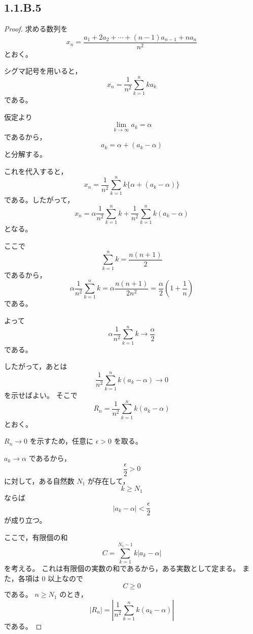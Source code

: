 \subsection{1.1.B.5}
\begin{proof}
    求める数列を
    \[
        x_n=
        \frac{a_1+2a_2+\cdots+(n-1)a_{n-1}+na_n}{n^2}
    \]
    とおく。

    シグマ記号を用いると，
    \[
        x_n=
        \frac{1}{n^2}\sum_{k=1}^{n}ka_k
    \]
    である。

    仮定より
    \[
        \lim_{k\to\infty}a_k=\alpha
    \]
    であるから，
    \[
        a_k=\alpha+(a_k-\alpha)
    \]
    と分解する。

    これを代入すると，
    \[
        x_n
        =
        \frac{1}{n^2}\sum_{k=1}^{n}k\{\alpha+(a_k-\alpha)\}
    \]
    である。したがって，
    \[
        x_n
        =
        \alpha\frac{1}{n^2}\sum_{k=1}^{n}k
        +
        \frac{1}{n^2}\sum_{k=1}^{n}k(a_k-\alpha)
    \]
    となる。

    ここで
    \[
        \sum_{k=1}^{n}k=\frac{n(n+1)}{2}
    \]
    であるから，
    \[
        \alpha\frac{1}{n^2}\sum_{k=1}^{n}k
        =
        \alpha\frac{n(n+1)}{2n^2}
        =
        \frac{\alpha}{2}\left(1+\frac{1}{n}\right)
    \]
    である。

    よって
    \[
        \alpha\frac{1}{n^2}\sum_{k=1}^{n}k
        \to
        \frac{\alpha}{2}
    \]
    である。

    したがって，あとは
    \[
        \frac{1}{n^2}\sum_{k=1}^{n}k(a_k-\alpha)
        \to 0
    \]
    を示せばよい。
    そこで
    \[
        R_n=
        \frac{1}{n^2}\sum_{k=1}^{n}k(a_k-\alpha)
    \]
    とおく。

    $R_n\to 0$ を示すため，任意に $\epsilon>0$ を取る。

    $a_k\to\alpha$ であるから，
    \[
        \frac{\epsilon}{2}>0
    \]
    に対して，ある自然数 $N_1$ が存在して，
    \[
        k\geq N_1
    \]
    ならば
    \[
        |a_k-\alpha|<\frac{\epsilon}{2}
    \]
    が成り立つ。

    ここで，有限個の和
    \[
        C=
        \sum_{k=1}^{N_1-1}k|a_k-\alpha|
    \]
    を考える。
    これは有限個の実数の和であるから，ある実数として定まる。
    また，各項は $0$ 以上なので
    \[
        C\geq 0
    \]
    である。
    $n\geq N_1$ のとき，
    \[
        |R_n|
        =
        \left|
            \frac{1}{n^2}\sum_{k=1}^{n}k(a_k-\alpha)
        \right|
    \]
    である。


\end{proof}
